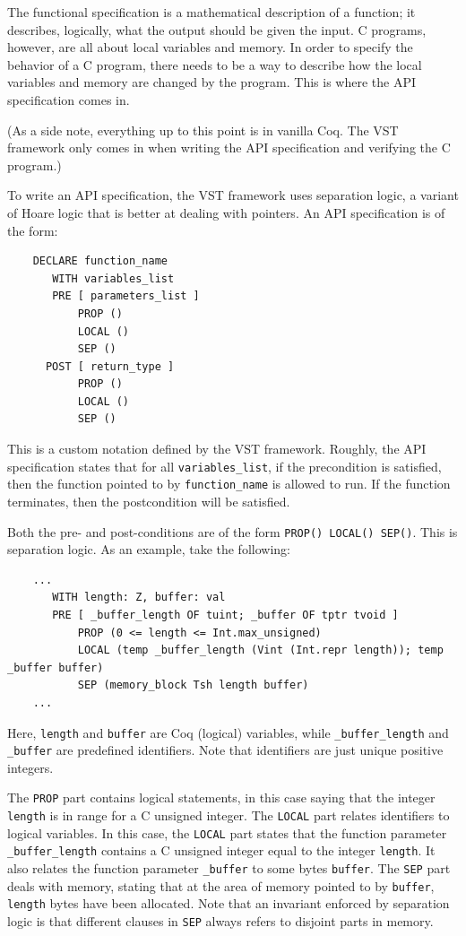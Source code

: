 \documentclass[pageno]{jpaper}
\begin{document}
The functional specification is a mathematical description of a function; it describes, logically, what the output should be given the input. C programs, however, are all about local variables and memory. In order to specify the behavior of a C program, there needs to be a way to describe how the local variables and memory are changed by the program. This is where the API specification comes in.

(As a side note, everything up to this point is in vanilla Coq. The VST framework only comes in when writing the API specification and verifying the C program.)

To write an API specification, the VST framework uses separation logic, a variant of Hoare logic that is better at dealing with pointers. An API specification is of the form:

\begin{lstlisting}
    DECLARE function_name
       WITH variables_list
       PRE [ parameters_list ]
           PROP ()
           LOCAL ()
           SEP ()
      POST [ return_type ]
           PROP ()
           LOCAL ()
           SEP ()
\end{lstlisting}

This is a custom notation defined by the VST framework. Roughly, the API specification states that for all \lstinline{variables_list}, if the precondition is satisfied, then the function pointed to by \lstinline{function_name} is allowed to run. If the function terminates, then the postcondition will be satisfied.

Both the pre- and post-conditions are of the form \lstinline{PROP() LOCAL() SEP()}. This is separation logic. As an example, take the following:

\begin{lstlisting}
    ...
       WITH length: Z, buffer: val
       PRE [ _buffer_length OF tuint; _buffer OF tptr tvoid ]
           PROP (0 <= length <= Int.max_unsigned)
           LOCAL (temp _buffer_length (Vint (Int.repr length)); temp _buffer buffer)
           SEP (memory_block Tsh length buffer)
    ...
\end{lstlisting}


Here, \lstinline{length} and \lstinline{buffer} are Coq (logical) variables, while \lstinline{_buffer_length} and \lstinline{_buffer} are predefined identifiers. Note that identifiers are just unique positive integers.

The \lstinline{PROP} part contains logical statements, in this case saying that the integer \lstinline{length} is in range for a C unsigned integer. The \lstinline{LOCAL} part relates identifiers to logical variables. In this case, the \lstinline{LOCAL} part states that the function parameter \lstinline{_buffer_length} contains a C unsigned integer equal to the integer \lstinline{length}. It also relates the function parameter \lstinline{_buffer} to some bytes \lstinline{buffer}. The \lstinline{SEP} part deals with memory, stating that at the area of memory pointed to by \lstinline{buffer}, \lstinline{length} bytes have been allocated. Note that an invariant enforced by separation logic is that different clauses in \lstinline{SEP} always refers to disjoint parts in memory.
\end{document}
